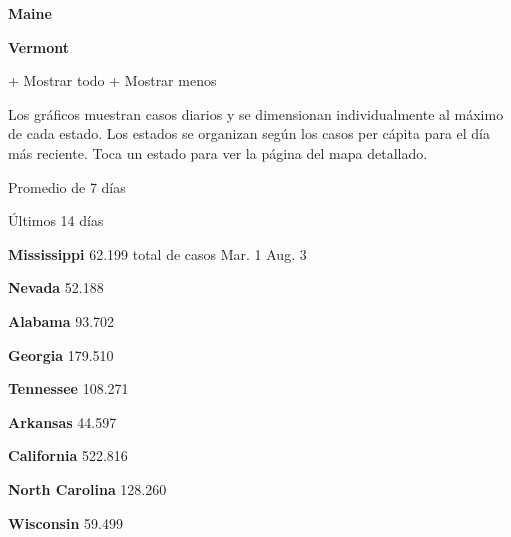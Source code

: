 \textbf{Maine}

\href{https://www.nytimes3xbfgragh.onion/interactive/2020/us/vermont-coronavirus-cases.html}{}

\textbf{Vermont}

+ Mostrar todo + Mostrar menos

Los gráficos muestran casos diarios y se dimensionan individualmente al
máximo de cada estado. Los estados se organizan según los casos per
cápita para el día más reciente. Toca un estado para ver la página del
mapa detallado.

\href{https://www.nytimes3xbfgragh.onion/interactive/2020/us/mississippi-coronavirus-cases.html}{}

Promedio de 7 días

Últimos 14 días

\textbf{Mississippi} 62.199 total de casos Mar. 1 Aug. 3

\href{https://www.nytimes3xbfgragh.onion/interactive/2020/us/nevada-coronavirus-cases.html}{}

\textbf{Nevada} 52.188

\href{https://www.nytimes3xbfgragh.onion/interactive/2020/us/alabama-coronavirus-cases.html}{}

\textbf{Alabama} 93.702

\href{https://www.nytimes3xbfgragh.onion/interactive/2020/us/georgia-coronavirus-cases.html}{}

\textbf{Georgia} 179.510

\href{https://www.nytimes3xbfgragh.onion/interactive/2020/us/tennessee-coronavirus-cases.html}{}

\textbf{Tennessee} 108.271

\href{https://www.nytimes3xbfgragh.onion/interactive/2020/us/arkansas-coronavirus-cases.html}{}

\textbf{Arkansas} 44.597

\href{https://www.nytimes3xbfgragh.onion/interactive/2020/us/california-coronavirus-cases.html}{}

\textbf{California} 522.816

\href{https://www.nytimes3xbfgragh.onion/interactive/2020/us/north-carolina-coronavirus-cases.html}{}

\textbf{North Carolina} 128.260

\href{https://www.nytimes3xbfgragh.onion/interactive/2020/us/wisconsin-coronavirus-cases.html}{}

\textbf{Wisconsin} 59.499

\href{https://www.nytimes3xbfgragh.onion/interactive/2020/us/iowa-coronavirus-cases.html}{}

